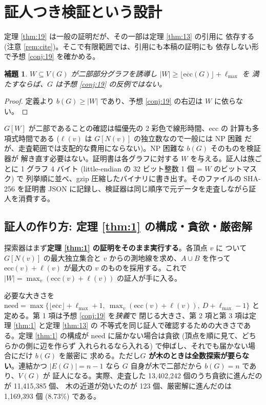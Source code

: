 \documentclass[paper=a4,fontsize=10.5pt,jafontsize=10.5pt]{jlreq}
\theoremstyle{plain}
\newtheorem{lemma}[theorem]{補題}
\theoremstyle{definition}
\begin{document}
\section{証人つき検証という設計}\label{sec:design}

定理 \ref{thm:19} は一般の証明だが、その一部は定理 \ref{thm:13} の引用に
依存する (注意 \ref{rem:cite})。そこで有限範囲では、引用にも本稿の証明にも
依存しない形で予想 \ref{conj:19} を確かめる。

\begin{lemma}\label{lem:witness}
$W \subseteq V(G)$ が二部部分グラフを誘導し
$|W| \ge \lfloor \overline{\mathrm{ecc}}(G) \rfloor + \ell_{\max}$ を
満たすならば、$G$ は予想 \ref{conj:19} の反例ではない。
\end{lemma}

\begin{proof}
定義より $b(G) \ge |W|$ であり、予想 \ref{conj:19} の右辺は $W$ に依らない。
\end{proof}

$G[W]$ が二部であることの確認は幅優先の 2 彩色で線形時間、$\mathrm{ecc}$ の
計算も多項式時間である ($\ell(v)$ は $G[N(v)]$ の独立数なので一般には NP 困難
だが、走査範囲では支配的な費用にならない)。NP 困難な $b(G)$ そのものを検証器が
解き直す必要はない。証明書は各グラフに対する $W$ を与える。証人は族ごとに
1 グラフ 4 バイト (little-endian の 32 ビット整数 1 個 = $W$ のビットマスク) で
列挙順に並べ、gzip 圧縮したバイナリに書き出す。そのファイルの SHA-256 を証明書
JSON に記録し、検証器は同じ順序で元データを走査しながら証人を消費する。

\subsection{証人の作り方: 定理 \ref{thm:1} の構成・貪欲・厳密解}

探索器はまず\textbf{定理 \ref{thm:1} の証明をそのまま実行する}。各頂点 $v$ に
ついて $G[N(v)]$ の最大独立集合と $v$ からの測地線を求め、$A \cup B$ を作って
$\mathrm{ecc}(v) + \ell(v)$ が最大の $v$ のものを採用する。これで
$|W| = \max_v (\mathrm{ecc}(v) + \ell(v))$ の証人が手に入る。

必要な大きさを
$\mathrm{need} = \max\{\lfloor \overline{\mathrm{ecc}} \rfloor +
\ell_{\max} + 1,\ \max_v (\mathrm{ecc}(v) + \ell(v)),\
D + \ell_{\max} - 1\}$ と定める。第 1 項は予想 \ref{conj:19} を\emph{狭義}で
閉じる大きさ、第 2 項と第 3 項は定理 \ref{thm:1} と定理 \ref{thm:13} の
不等式を同じ証人で確認するための大きさである。定理 \ref{thm:1} の構成が
$\mathrm{need}$ に届かない場合は貪欲 (頂点を順に見て、どちらかの側に辺を作らず
入れられるなら入れる) で伸ばし、それでも届かない場合にだけ $b(G)$ を厳密に
求める。ただし\textbf{$G$ が木のときは全数探索が要らない}。連結かつ
$|E(G)| = n - 1$ なら $G$ 自身が木で二部だから $b(G) = n$ であり、$V(G)$ が
証人になる。実際、走査した 13,402,242 個のうち貪欲に進んだのが 11,415,385 個、
木の近道が効いたのが 123 個、厳密解に進んだのは 1,169,393 個
(8.73\%) である。
\end{document}
